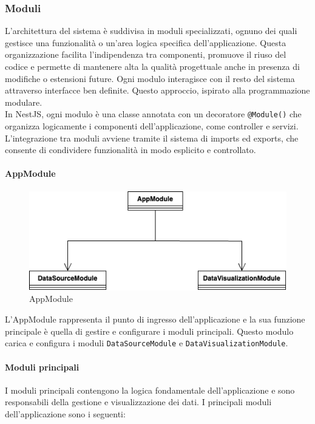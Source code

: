 \subsubsection{Moduli}

L'architettura del sistema è suddivisa in moduli specializzati, ognuno dei quali gestisce una funzionalità o un'area logica specifica dell'applicazione. Questa organizzazione facilita l’indipendenza tra componenti, promuove il riuso del codice e permette di mantenere alta la qualità progettuale anche in presenza di modifiche o estensioni future.
Ogni modulo interagisce con il resto del sistema attraverso interfacce ben definite. Questo approccio, ispirato alla programmazione modulare.\\
In NestJS, ogni modulo è una classe annotata con un decoratore \texttt{@Module()} che organizza logicamente i componenti dell’applicazione, come controller e servizi. L’integrazione tra moduli avviene tramite il sistema di imports ed exports, che consente di condividere funzionalità in modo esplicito e controllato.

\paragraph{AppModule}

\begin{figure}[H] 
    \centering
    \includegraphics[scale = 0.6]{template/images/uml_back/AppModule.png}
    \caption{AppModule}
\end{figure}

L'AppModule rappresenta il punto di ingresso dell'applicazione e la sua funzione principale è quella di gestire e configurare i moduli principali. Questo modulo carica e configura i moduli \texttt{DataSourceModule} e \texttt{DataVisualizationModule}.

\paragraph{Moduli principali}
I moduli principali contengono la logica fondamentale dell'applicazione e sono responsabili della gestione e visualizzazione dei dati. I principali moduli dell'applicazione sono i seguenti:

